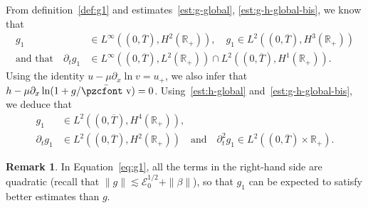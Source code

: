 \documentclass[10pt]{amsart}
\theoremstyle{definition}\newtheorem{defi}[theo]{Definition}\newtheorem{rema}[theo]{Remark}\newtheorem{exam}[theo]{Example}\newtheorem{exem}[theo]{Example}\newtheorem{nota}[theo]{Notation}
\newcommand{\mathpzc}[1]{\text{\pzcfont #1}}
\newcommand{\R}{\mathbb{R}}
\newcommand{\p}{\partial}
\newcommand{\bv}{\bar{\mathpzc{v}}}
\newcommand{\cE}{\mathcal E}
\begin{document}
From definition~\eqref{def:g1} and estimates~\eqref{est:g-global}, \eqref{est:g-h-global-bis}, we know that
\begin{equation}\label{reg:g1-1}
\begin{split}
g_1 &\in L^\infty\left((0, \overline{T}), H^2(\R_+)\right), \quad g_1\in L^2\left((0,\overline{T}), H^3(\R_+)\right)\\
\text{and that} \quad \p_t g_1 &\in L^\infty\left((0,\overline{T}), L^2(\R_+)\right)\cap L^2\left((0, \overline{T}), H^1(\R_+)\right).
\end{split}
\end{equation}
Using the identity $u-\mu\p_x \ln v=u_+$, we also infer that $h-\mu\p_x \ln (1+g/\bv)=0$. Using~\eqref{est:h-global} and~\eqref{est:g-h-global-bis}, we deduce that
\begin{equation}\label{reg:g1-3}
\begin{split}
g_1 &\in L^2\left((0, \overline{T}), H^4(\R_+)\right),
\\
\p_t g_1&\in L^2\left((0, \overline{T}), H^2(\R_+)\right) \quad \text{and} \quad \p^2_t g_1\in L^2\left((0, \overline{T}) \times \R_+\right).
\end{split}
\end{equation}



\begin{rema}\label{rmk:g1}
In Equation~\eqref{eq:g1}, all the terms in the right-hand side are quadratic (recall that $\|g\| \lesssim \cE_0^{1/2} + \|\beta\|$), so that $g_1$ can be expected to satisfy better estimates than $g$.
\end{rema}
\end{document}
